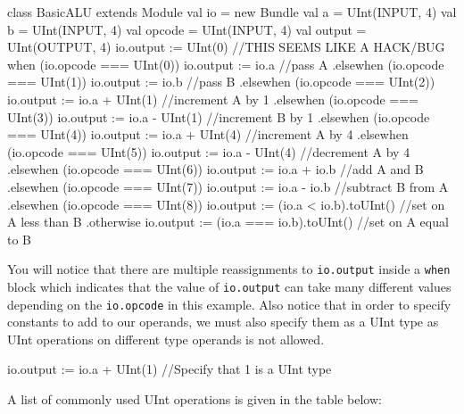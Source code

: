 \documentclass[twocolumn, 10pt]{article}
\begin{document}
\begin{scala}
class BasicALU extends Module {
  val io = new Bundle {
    val a      = UInt(INPUT, 4)
    val b      = UInt(INPUT, 4)
    val opcode = UInt(INPUT, 4)
    val output = UInt(OUTPUT, 4)
  }
  io.output := UInt(0) //THIS SEEMS LIKE A HACK/BUG
  when (io.opcode === UInt(0)) {
    io.output := io.a //pass A
  } .elsewhen (io.opcode === UInt(1)) {
    io.output := io.b //pass B
  } .elsewhen (io.opcode === UInt(2)) {
    io.output := io.a + UInt(1) //increment A by 1
  } .elsewhen (io.opcode === UInt(3)) {
    io.output := io.a - UInt(1) //increment B by 1
  } .elsewhen (io.opcode === UInt(4)) {
    io.output := io.a + UInt(4) //increment A by 4
  } .elsewhen (io.opcode === UInt(5)) {
    io.output := io.a - UInt(4) //decrement A by 4
  } .elsewhen (io.opcode === UInt(6)) {
    io.output := io.a + io.b //add A and B
  } .elsewhen (io.opcode === UInt(7)) {
    io.output := io.a - io.b //subtract B from A
  } .elsewhen (io.opcode === UInt(8)) {
    io.output := (io.a < io.b).toUInt() //set on A less than B
  } .otherwise { 
    io.output :=  (io.a === io.b).toUInt() //set on A equal to B
  }
}
\end{scala}

You will notice that there are multiple reassignments to \verb+io.output+ inside a \verb+when+ block which indicates that the value of \verb+io.output+ can take many different values depending on the \verb+io.opcode+ in this example. Also notice that in order to specify constants to add to our operands, we must also specify them as a UInt type as UInt operations on different type operands is not allowed.

\begin{scala}
io.output := io.a + UInt(1) //Specify that 1 is a UInt type
\end{scala}

A list of commonly used UInt operations is given in the table below:
\end{document}
